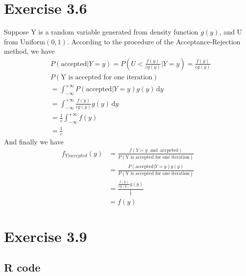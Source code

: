 \documentclass{article}
\begin{document}
\section{Exercise 3.6}
    Suppose Y is a random variable generated from density function $g(y)$, 
    and U from Uniform$(0,1)$. According to the procedure of the Acceptance-Rejection method, 
    we have
    \begin{align*}
        &P(\text{accepted}|Y=y) = P(U<\frac{f(y)}{cg(y)}|Y=y) = \frac{f(y)}{cg(y)} \\
        &P(\text{Y is accepted for one iteration}) \\
        & = \int_{-\infty}^{+\infty}P(\text{accepted}|Y=y)g(y)\,\text{d}y \\
         &= \int_{-\infty}^{+\infty}\frac{f(y)}{cg(y)}g(y)\,\text{d}y \\
        & = \frac{1}{c} \int_{-\infty}^{+\infty}f(y) \\
        & = \frac{1}{c}
    \end{align*}
    And finally we have
    \begin{align*}
        f_{Y|accepted}(y) 
        &= \frac{f(Y=y \enspace \text{and} \enspace \text{accpeted})}{P(\text{Y is accepted for one iteration})} \\
        &= \frac{P(\text{accepted}|Y=y)g(y)}{P(\text{Y is accepted for one iteration})} \\
        &= \frac{\frac{f(y)}{cg(y)}g(y)}{\frac{1}{c}} \\
        &= f(y)
    \end{align*}

\section{Exercise 3.9}
    \subsection{R code}
        
\end{document}
